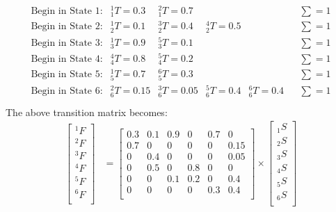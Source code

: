 \documentclass[a4paper,10pt]{article}
\newcommand{\st}[1]{\ensuremath{_{#1}{S}}}
\newcommand{\fin}[1]{\ensuremath{^{#1}{F}}}
\newcommand{\trans}[2]{\ensuremath{_{#1}^{#2}{T}}}
\begin{document}
\begin{equation*}
\begin{split}
\begin{array}{lllllll}
\text{Begin in State 1:} & \trans{1}{1} = 0.3 & \trans{1}{2} = 0.7 & & & & {\sum}{=1}\\
\text{Begin in State 2:} & \trans{2}{1} = 0.1 & \trans{2}{3} = 0.4 & \trans{2}{4} = 0.5 & & & {\sum}{=1}\\
\text{Begin in State 3:} & \trans{3}{1} = 0.9 & \trans{3}{5} = 0.1 & & & & {\sum}{=1}\\
\text{Begin in State 4:} & \trans{4}{4} = 0.8 & \trans{4}{5} = 0.2 & & & & {\sum}{=1}\\
\text{Begin in State 5:} & \trans{5}{1} = 0.7 & \trans{5}{6} = 0.3 & & & & {\sum}{=1}\\
\text{Begin in State 6:} & \trans{6}{2} = 0.15 & \trans{6}{3} = 0.05 & \trans{6}{5} = 0.4 & \trans{6}{6} = 0.4 & & {\sum}{=1}\\
\end{array}
\end{split} 
\end{equation*}
\newline\noindent\newline\noindent
The above transition matrix becomes:
\newline\noindent\newline\noindent
\begin{equation*}
\begin{split}
\left[\begin{array}{r}
\fin{1} \\ \fin{2} \\ \fin{3} \\ \fin{4} \\ \fin{5} \\ \fin{6} \\
\end{array}\right]
&=\boxed{
\left[\begin{array}{cccccc}
0.3 & 0.1 & 0.9 & 0 & 0.7 & 0 \\
0.7 & 0 & 0 & 0 & 0 & 0.15 \\
0 & 0.4 & 0 & 0 & 0 & 0.05 \\
0 & 0.5 & 0 & 0.8 & 0 & 0 \\
0 & 0 & 0.1 & 0.2 & 0 & 0.4 \\
0 & 0 & 0 & 0 & 0.3 & 0.4 \\
\end{array}\right]}\times
\left[\begin{array}{r}
\st{1} \\ \st{2} \\ \st{3} \\ \st{4} \\ \st{5} \\ \st{6} \\
\end{array}\right]
\end{split} 
\end{equation*}
\end{document}
